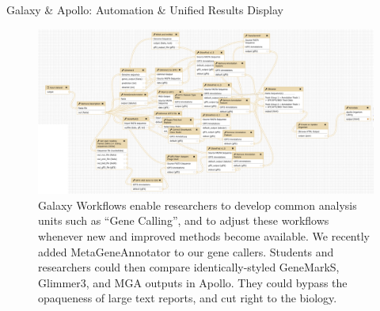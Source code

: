 \documentclass[final,t,20pt]{beamer}
\begin{document}
\begin{frame}[fragile]
\begin{columns}[t]
\begin{column}{.60\linewidth}
\begin{block}{Galaxy \& Apollo: Automation \& Unified Results Display }
                \begin{figure}
                    \includegraphics[width=\textwidth]{./media/workflow.png}
                    \caption{Galaxy Workflows enable researchers to develop
                    common analysis units such as ``Gene Calling'', and to
                    adjust these workflows whenever new and improved methods
                    become available. We recently added MetaGeneAnnotator to our
                    gene callers. Students and researchers could then
                    compare identically-styled GeneMarkS, Glimmer3, and MGA
                    outputs in Apollo. They could bypass the opaqueness of
                    large text reports, and cut right to the biology.}
                    \vspace{-0.3cm}
                \end{figure}
            \end{block}
        \end{column}
  \end{columns}
\end{frame}
\end{document}
